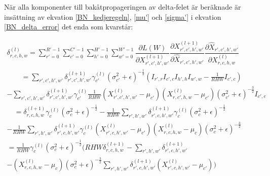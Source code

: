\documentclass[a4paper,11pt,twoside]{article}
\newcommand*{\pd}[2]{\ensuremath{\dfrac{\partial #1}{\partial #2}}}
\begin{document}
När alla komponenter till bakåtpropageringen av delta-felet är beräknade är insättning av ekvation \eqref{BN_kedjeregeln}, \eqref{mu'} och \eqref{sigma'} i ekvation \eqref{BN_delta_error} det enda som kvarstår:

\begin{multline}\label{finalBNeq}
	\delta^{(l)}_{r,c,h,w} = \sum^{R'-1}_{r'=0} \sum^{C'-1}_{c'=0} \sum^{H'-1}_{h'=0} \sum^{W'-1}_{w'=0} \pd{L(W)}{X^{(l+1)}_{r',c',h',w'}} \pd{X^{(l+1)}_{r',c',h',w'}}{\hat{X}_{r',c',h',w'}} \pd{\hat{X}_{r',c',h',w'}}{{X}^{(l)}_{r,c,h,w}}\\
		\qquad = \sum\limits_{r',c',h',w'}\delta^{(l+1)}_{r',c',h',w'} \gamma^{(l)}_{c'} {(\sigma^2_{c'} + \epsilon)}^{-\frac{1}{2}} (I_{r',r} I_{c',c} I_{h',h} I_{w',w} - \frac{1}{RHW} I_{c',c}) \\
	-\sum\limits_{r',c',h',w'}\delta^{(l+1)}_{r',c',h',w'} \gamma^{(l)}_{c'} \frac{1}{RHW} ({X^{(l)}_{r',c',h',w'} - \mu_{c'}})({X^{(l)}_{r,c',h,w} - \mu_{c'}}) {(\sigma^2_{c'} + \epsilon)}^{-\frac{3}{2}} I_{c',c} \\
	\quad = \delta^{(l+1)}_{r,c,h,w} \gamma^{(l)}_{c} {(\sigma^2_{c} + \epsilon)}^{-\frac{1}{2}} - \frac{1}{RHW} \sum\limits_{r',h',w'} \delta^{(l+1)}_{r',c,h',w'} \gamma^{(l)}_{c} {(\sigma^2_{c} + \epsilon)}^{-\frac{1}{2}}\\
	- \frac{1}{RHW} \sum\limits_{r',h',w'} \delta^{(l+1)}_{r',c,h',w'}\gamma^{(l)}_{c} ({X^{(l)}_{r',c,h',w'} - \mu_{c'}})({X^{(l)}_{r,c,h,w} - \mu_{c}}){(\sigma^2_{c} + \epsilon)}^{-\frac{3}{2}} \\
	= \frac{1}{RHW} \gamma^{(l)}_c {(\sigma^2_{c} + \epsilon)}^{-\frac{1}{2}} \biggl(    RHW \delta^{(l+1)}_{r,c,h,w} -  \sum\limits_{r',h',w'} \delta^{(l+1)}_{r',c,h',w'} \qquad \\
	-  ({X^{(l)}_{r,c,h,w} - \mu_{c}}) {(\sigma^2_{c} + \epsilon)}^{-\frac{3}{2}} \sum\limits_{r',h',w'} \delta^{(l+1)}_{r',c,h',w'} ({X^{(l)}_{r',c,h',w'} - \mu_{c'}}) \biggl) \\
\end{multline}
\end{document}
